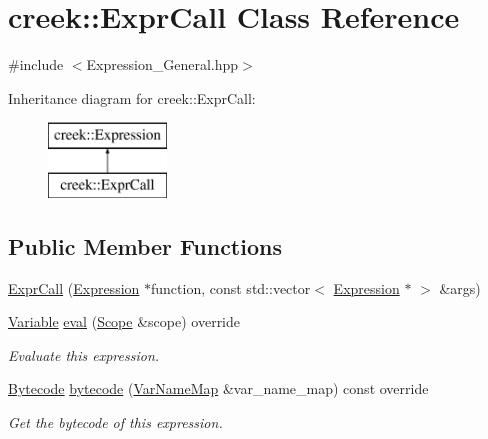 \hypertarget{classcreek_1_1_expr_call}{}\section{creek\+:\+:Expr\+Call Class Reference}
\label{classcreek_1_1_expr_call}


{\ttfamily \#include $<$Expression\+\_\+\+General.\+hpp$>$}

Inheritance diagram for creek\+:\+:Expr\+Call\+:\begin{figure}[H]
\begin{center}
\leavevmode
\includegraphics[height=2.000000cm]{classcreek_1_1_expr_call}
\end{center}
\end{figure}
\subsection*{Public Member Functions}
\begin{DoxyCompactItemize}
\item 
\hyperlink{classcreek_1_1_expr_call_a648c2887b0668026a55f40dbc0d90845}{Expr\+Call} (\hyperlink{classcreek_1_1_expression}{Expression} $\ast$function, const std\+::vector$<$ \hyperlink{classcreek_1_1_expression}{Expression} $\ast$ $>$ \&args)
\item 
\hyperlink{classcreek_1_1_variable}{Variable} \hyperlink{classcreek_1_1_expr_call_a866b5e444449beae3332e224705b9c74}{eval} (\hyperlink{classcreek_1_1_scope}{Scope} \&scope) override
\begin{DoxyCompactList}\small\item\em Evaluate this expression. \end{DoxyCompactList}\item 
\hyperlink{classcreek_1_1_bytecode}{Bytecode} \hyperlink{classcreek_1_1_expr_call_aa737741deb582a2c5f16935e30f7c52c}{bytecode} (\hyperlink{classcreek_1_1_var_name_map}{Var\+Name\+Map} \&var\+\_\+name\+\_\+map) const  override\hypertarget{classcreek_1_1_expr_call_aa737741deb582a2c5f16935e30f7c52c}{}\label{classcreek_1_1_expr_call_aa737741deb582a2c5f16935e30f7c52c}

\begin{DoxyCompactList}\small\item\em Get the bytecode of this expression. \end{DoxyCompactList}\end{DoxyCompactItemize}



